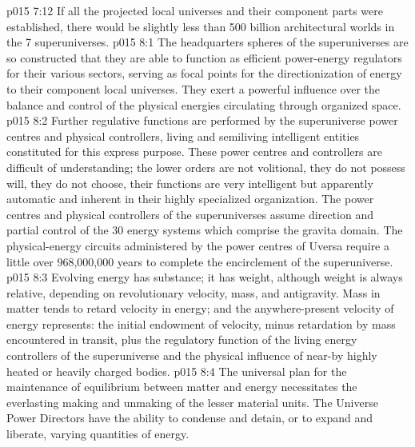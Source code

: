\vs p015 7:12 \pc If all the projected local universes and their component parts were established, there would be slightly less than 500 billion architectural worlds in the 7 superuniverses.
\vs p015 8:1 The headquarters spheres of the superuniverses are so constructed that they are able to function as efficient power\hyp{}energy regulators for their various sectors, serving as focal points for the directionization of energy to their component local universes. They exert a powerful influence over the balance and control of the physical energies circulating through organized space.
\vs p015 8:2 Further regulative functions are performed by the superuniverse power centres and physical controllers, living and semiliving intelligent entities constituted for this express purpose. These power centres and controllers are difficult of understanding; the lower orders are not volitional, they do not possess will, they do not choose, their functions are very intelligent but apparently automatic and inherent in their highly specialized organization. The power centres and physical controllers of the superuniverses assume direction and partial control of the 30 energy systems which comprise the gravita domain. The physical\hyp{}energy circuits administered by the power centres of Uversa require a little over 968,000,000 years to complete the encirclement of the superuniverse.
\vs p015 8:3 \pc Evolving energy has substance; it has weight, although weight is always relative, depending on revolutionary velocity, mass, and antigravity. Mass in matter tends to retard velocity in energy; and the anywhere\hyp{}present velocity of energy represents: the initial endowment of velocity, minus retardation by mass encountered in transit, plus the regulatory function of the living energy controllers of the superuniverse and the physical influence of near\hyp{}by highly heated or heavily charged bodies.
\vs p015 8:4 The universal plan for the maintenance of equilibrium between matter and energy necessitates the everlasting making and unmaking of the lesser material units. The Universe Power Directors have the ability to condense and detain, or to expand and liberate, varying quantities of energy.
